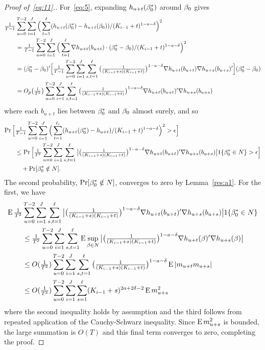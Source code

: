 \documentclass[12pt,fleqn]{article}
\begin{document}
\begin{proof}[Proof of~\eqref{eq:11}.]
For~\eqref{eq:5}, expanding $h_{u+t}(\beta_0^*)$ around $\beta_0$ gives
\begin{align*}
  \tfrac{1}{T-1} & \sum_{u = 0}^{T-2} \sum_{i=1}^J \Big(\sum_{t = 1}^{\ell} (h_{u + t}(\beta_0^*) - h_{u + t}(\beta_0))/ (K_{i-1} + t)^{1-a-\delta} \Big)^2 \\
  &= \tfrac{1}{T-1} \sum_{u = 0}^{T-2} \sum_{i=1}^J \Big(\sum_{t = 1}^{\ell}
  \nabla h_{u + t}(b_{u+t}) \cdot (\beta_0^* - \beta_0) / (K_{i-1} + t)^{1-a-\delta}\Big)^2 \\
  &= (\beta_0^* - \beta_0)' \Big[\tfrac{1}{T-1} \sum_{u = 0}^{T-2} \sum_{i=1}^J \sum_{s,t = 1}^{\ell}
  \big(\tfrac{1}{(K_{i-1} + s) (K_{i-1} + t)}\big)^{1-a-\delta} \nabla h_{u + t}(b_{u+t}) \nabla h_{u + s}(b_{u+s})' \Big] (\beta_0^* - \beta_0) \\
  &= O_p\big(\tfrac{1}{T^2}\big) \sum_{u = 0}^{T-2} \sum_{i=1}^J \sum_{s,t = 1}^{\ell}
  \big(\tfrac{1}{(K_{i-1} + s) (K_{i-1} + t)}\big)^{1-a-\delta} \nabla h_{u + t}(b_{u+t})' \nabla h_{u + s}(b_{u+s})
\end{align*}
where each $b_{u+t}$ lies between $\beta_0^*$ and $\beta_0$ almost surely, and so
\begin{align*}
  \operatorname{Pr}\Big[& \tfrac{1}{T-1} \sum_{u = 0}^{T-2} \sum_{i=1}^J
  \Big(\sum_{t = 1}^{\ell_{i}} (h_{u + t}(\beta_0^*) - h_{u + t})/ (K_{i-1} + t)^{1-a-\delta}\Big)^2 > \epsilon \Big] \\
  & \leq \operatorname{Pr}\Big[ \tfrac{1}{T^2} \sum_{u = 0}^{T-2} \sum_{i=1}^J \sum_{s,t = 1}^{\ell}
  \big\lvert \big(\tfrac{1}{(K_{i-1} + s) (K_{i-1} + t)}\big)^{1-a-\delta}
  \nabla h_{u + t}(b_{u+t})' \nabla h_{u + s}(b_{u+s}) \big\rvert 1\{\beta_0^* \in N\} > \epsilon \Big] \\
  &\quad + \operatorname{Pr}[\beta_0^* \notin N].
\end{align*}
The second probability, $\operatorname{Pr}[\beta_0^* \notin N]$, converges to zero by
Lemma~\ref{res:a1}. For the first, we have
\begin{align*}
  \operatorname{E} \tfrac{1}{T^2} &\sum_{u = 0}^{T-2} \sum_{i=1}^J \sum_{s,t = 1}^{\ell}
  \big\lvert \big(\tfrac{1}{(K_{i-1} + s) (K_{i-1} + t)}\big)^{1-a-\delta}
  \nabla h_{u + t}(b_{u+t})' \nabla h_{u + s}(b_{u+s}) \big\rvert 1\{\beta_0^* \in N\} \\
  &\leq \tfrac{1}{T^2} \sum_{u = 0}^{T-2} \sum_{i=1}^J \sum_{s,t = 1}^{\ell}
  \operatorname{E} \sup_{\beta \in N} \big\lvert \big(\tfrac{1}{(K_{i-1} + s) (K_{i-1} + t)}\big)^{1-a-\delta}
  \nabla h_{u + t}(\beta)' \nabla h_{u + s}(\beta) \big\rvert \\
  &\leq O(\tfrac{1}{T^2}) \sum_{u = 0}^{T-2} \sum_{i=1}^J \sum_{s,t = 1}^{\ell}
  \big(\tfrac{1}{(K_{i-1} + s) (K_{i-1} + t)}\big)^{1-a-\delta} \operatorname{E} | m_{u+t} m_{u+s} | \\
  &\leq O(\tfrac{1}{T^2}) \sum_{u=0}^{T-2} \sum_{i=1}^J \sum_{s = 1}^{\ell} (K_{i-1} + s)^{2a + 2\delta - 2} \operatorname{E} m_{u+s}^2
\end{align*}
where the second inequality holds by assumption and the third follows
from repeated application of the Cauchy-Schwarz inequality. Since $\operatorname{E}
m_{u+s}^2$ is bounded, the large summation is $O(T)$ and this final
term converges to zero, completing the proof.
\end{proof}
\end{document}
